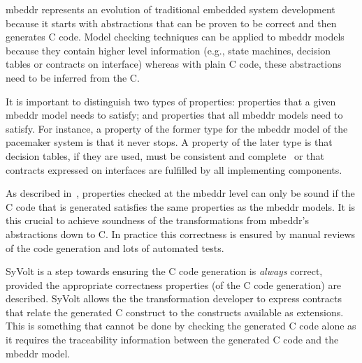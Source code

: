 mbeddr represents an evolution of traditional embedded system development
because it starts with abstractions that can be proven to be
correct and then generates C code.
Model checking techniques can be applied to mbeddr models because they contain
higher level information (e.g., state machines, decision tables or contracts on
interface) whereas with plain C code, these abstractions need to be inferred
from the C.


It is important to distinguish two types of properties: properties that a given
mbeddr model needs to satisfy; and properties that all mbeddr models need to
satisfy. For instance, a property of the former type for the mbeddr model of the
pacemaker system is that it never stops. A property of the later type is that
decision tables, if they are used, must be consistent and
complete~\cite{Ratiu:2012:LEE:2663689.2663692} or that contracts expressed on
interfaces are fulfilled by all implementing components.

As described in~\cite{Ratiu:2012:LEE:2663689.2663692}, properties checked at the
mbeddr level can only be sound if the C code that is generated satisfies the
same properties as the mbeddr models. It is this crucial to achieve soundness of
the transformations from mbeddr's abstractions down to C. In practice this
correctness is ensured by manual reviews of the code generation and
lots of automated tests.

SyVolt is a step towards ensuring the C code generation is \emph{always}
correct, provided the appropriate correctness properties (of the C code
generation) are described. SyVolt allows the the transformation developer to
express contracts that relate the generated C construct to the constructs
available as extensions. This is something that cannot be done by checking the
generated C code alone as it requires the traceability information between the
generated C code and the mbeddr model.

